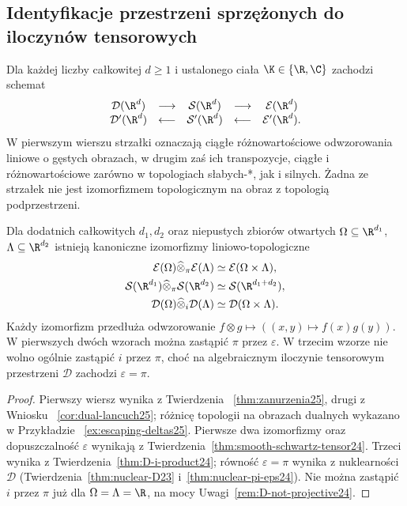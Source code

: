 \subsection{Identyfikacje przestrzeni sprzężonych do iloczynów tensorowych}

\begin{stwierdzenie}
\label{prop:summary25}
Dla każdej liczby całkowitej $d\ge1$ i ustalonego
ciała $\K\in\{\R,\C\}$ zachodzi schemat
\[
 \begin{array}{ccccc}
 \mathcal D(\R^d)&\longrightarrow&\mathcal S(\R^d)
 &\longrightarrow&\mathcal E(\R^d)\\
 \mathcal D'(\R^d)&\longleftarrow&\mathcal S'(\R^d)
 &\longleftarrow&\mathcal E'(\R^d).
 \end{array}
\]
W pierwszym wierszu strzałki oznaczają ciągłe
różnowartościowe odwzorowania liniowe o gęstych obrazach,
w drugim zaś ich transpozycje, ciągłe i różnowartościowe
zarówno w topologiach słabych-*, jak i silnych.
Żadna ze strzałek nie jest izomorfizmem topologicznym
na obraz z topologią podprzestrzeni.

Dla dodatnich całkowitych $d_1,d_2$ oraz niepustych
zbiorów otwartych $\Omega\subseteq\R^{d_1}$,
$\Lambda\subseteq\R^{d_2}$ istnieją kanoniczne
izomorfizmy liniowo-topologiczne
\[
\begin{aligned}
 \mathcal E(\Omega)\widehat\otimes_\pi\mathcal E(\Lambda)
 &\simeq\mathcal E(\Omega\times\Lambda),\\
 \mathcal S(\R^{d_1})\widehat\otimes_\pi\mathcal S(\R^{d_2})
 &\simeq\mathcal S(\R^{d_1+d_2}),\\
 \mathcal D(\Omega)\widehat\otimes_i\mathcal D(\Lambda)
 &\simeq\mathcal D(\Omega\times\Lambda).
\end{aligned}
\]
Każdy izomorfizm przedłuża odwzorowanie
$f\otimes g\mapsto ((x,y)\mapsto f(x)g(y))$.
W pierwszych dwóch wzorach można zastąpić $\pi$
przez $\varepsilon$. W trzecim wzorze nie wolno
ogólnie zastąpić $i$ przez $\pi$, choć na algebraicznym
iloczynie tensorowym przestrzeni $\mathcal D$
zachodzi $\varepsilon=\pi$.
\end{stwierdzenie}
\begin{proof}
Pierwszy wiersz wynika z Twierdzenia~
\ref{thm:zanurzenia25}, drugi z Wniosku~
\ref{cor:dual-lancuch25}; różnicę topologii
na obrazach dualnych wykazano w Przykładzie~
\ref{ex:escaping-deltas25}. Pierwsze dwa izomorfizmy
oraz dopuszczalność $\varepsilon$ wynikają z
Twierdzenia~\ref{thm:smooth-schwartz-tensor24}.
Trzeci wynika z Twierdzenia~\ref{thm:D-i-product24};
równość $\varepsilon=\pi$ wynika z nuklearności
$\mathcal D$ (Twierdzenia~\ref{thm:nuclear-D23}
i~\ref{thm:nuclear-pi-eps24}). Nie można zastąpić
$i$ przez $\pi$ już dla $\Omega=\Lambda=\R$,
na mocy Uwagi~\ref{rem:D-not-projective24}.
\end{proof}

